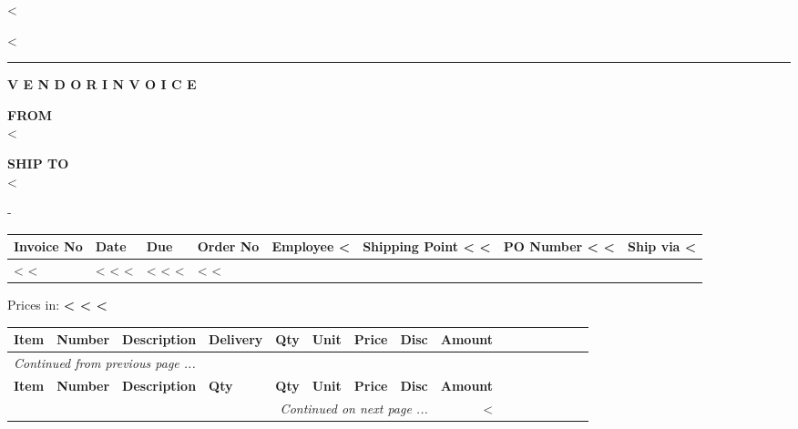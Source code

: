 <%

\begin{CJK}{UTF8}{arialuni}

\vspace*{-3.3cm}
<%

\rule{\textwidth}{0.5pt}

\vspace*{0.5cm}

\centerline{\textbf{V E N D O R \hspace{0.2cm} I N V O I C E}}
\normalsize
\vspace{1.2cm}

\parbox[t]{.55\textwidth}{
\textbf{FROM} \\
<%
}
\parbox[t]{.40\textwidth}{
\textbf{SHIP TO} \\
<%
}

\vspace{0.5cm}
-
\vspace{0.2cm}

\begin{tabularx}{\textwidth}{*{8}{|X}|} \hline
  \textbf{Invoice No} & \textbf{Date} & \textbf{Due} & \textbf{Order No}
  & \textbf{Employee}
  <%
  & \textbf{Shipping Point}
  <%
  <%
  & \textbf{PO Number}
  <%
  <%
  & \textbf{Ship via}
  <%
  \\ [0.5em]
  \hline
  <%
  <%
  & <%
  <%
  <%
  & <%
  <%
  <%
  & <%
  <%
  \\
  \hline
\end{tabularx}

\vspace{0.5cm}
	Prices in: \textbf{<%
<%
<%
}
\vspace{0.5cm} 

\begin{longtable}{|ll p{5.5cm} @{\extracolsep\fill} lrlrrr|} \hline
  \textbf{Item} & \textbf{Number} & \textbf{Description} & \textbf{Delivery} &
        \textbf{Qty} &
  \textbf{Unit}  & \textbf{Price} & \textbf{Disc} & \textbf{Amount} \\
  \hline
\endfirsthead
  \multicolumn{8}{l}{\emph{Continued from previous page ...}} \\
  \hline
  \textbf{Item} & \textbf{Number} & \textbf{Description} & \textbf{Qty} & \textbf{Qty} &
  \textbf{Unit} & \textbf{Price} & \textbf{Disc} & \textbf{Amount} \\
  \hline
\endhead
   \hline \multicolumn{8}{r}{\emph{Continued on next page ...}}
\endfoot
   \hline
   \multicolumn{8}{|lr} \textbf{Total} & <%


\end{longtable}
\end{CJK}
